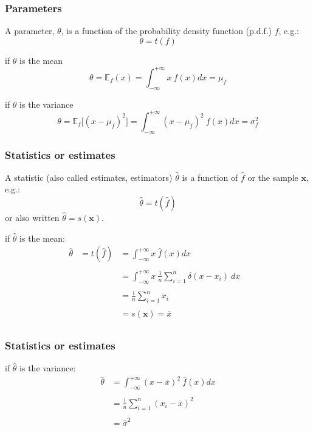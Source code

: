 \frame
{
\frametitle{Parameters}

\begin{definition}
A \alert{parameter}, $\theta$, is a function of the probability density function (p.d.f.) $f$, e.g.:
$$
\theta=t(f)
$$
\end{definition}
\begin{exampleblock}{if $\theta$ is the mean}
$$
\theta=\mathbb{E}_{f}(x) =\int_{-\infty}^{+\infty} x\ f(x) dx =\mu_f
$$
\end{exampleblock}
\begin{exampleblock}{if $\theta$ is the variance}
$$
\theta=\mathbb{E}_{f}\lbrack(x-\mu_f)^2\rbrack=\int_{-\infty}^{+\infty} (x-\mu_f)^2\ f(x) dx=\sigma_f^2
$$
\end{exampleblock}
}
\frame
{
\frametitle{Statistics or estimates}

\begin{definition}
A \alert{statistic} (also called estimates, estimators) $\hat{\theta}$ is a function of $\hat{f}$ or the sample $\mathbf{x}$, e.g.:
$$
\hat{\theta}=t(\hat{f})
$$
or also written $\hat{\theta}=s(\mathbf{x})$.
\end{definition}
\begin{exampleblock}{if $\hat{\theta}$ is the mean:}
$$
\begin{array}{llll}
\hat{\theta}&=t(\hat{f})&=\int_{-\infty}^{+\infty} x\ \hat{f}(x) dx & \\
&&&\\
&&=\int_{-\infty}^{+\infty} x\  \frac{1}{n}\sum_{i=1}^{n} \delta(x-x_i) \ dx&\\
&&&\\
&&= \frac{1}{n}\sum_{i=1}^{n} x_i &\\
&&&\\
&&=s(\mathbf{x})=\overline{x} &\\
\end{array}
$$
\end{exampleblock}
}
\frame
{
\frametitle{Statistics or estimates}
\begin{exampleblock}{if $\hat{\theta}$ is the variance:}
$$
\begin{array}{ll}
\hat{\theta}&=\int_{-\infty}^{+\infty} (x-\overline{x})^2\ \hat{f}(x) dx\\
&\\
&= \frac{1}{n}\sum_{i=1}^{n} (x_i-\overline{x})^{2}\\
&\\
&=\hat{\sigma}^{2}\\
\end{array}
$$ 

\end{exampleblock}
}


